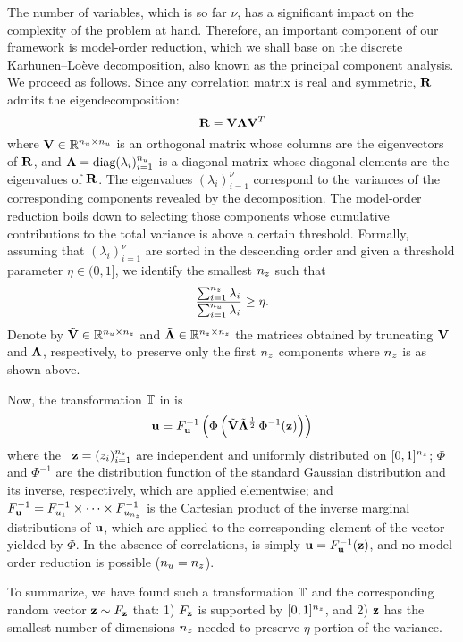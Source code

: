 The number of variables, which is so far $\nu$, has a significant impact on the
complexity of the problem at hand. Therefore, an important component of our
framework is model-order reduction, which we shall base on the discrete
Karhunen--Lo\`{e}ve decomposition, also known as the principal component
analysis. We proceed as follows. Since any correlation matrix is real and
symmetric, $\mathbf{R}$ admits the eigendecomposition:
\[
  \mathbf{R} = \mathbf{V} \mathbf{\Lambda} \mathbf{V}^T
\]
where $\mathbf{V} \in \mathbb{R}^{{n_u} \times {n_u}}$ is an orthogonal matrix whose columns
are the eigenvectors of $\mathbf{R}$, and $\mathbf{\Lambda} = \text{diag}(\lambda_i)_{i =
1}^{n_u}$ is a diagonal matrix whose diagonal elements are the eigenvalues of
$\mathbf{R}$. The eigenvalues $(\lambda_i)_{i = 1}^\nu$ correspond to the
variances of the corresponding components revealed by the decomposition. The
model-order reduction boils down to selecting those components whose cumulative
contributions to the total variance is above a certain threshold. Formally,
assuming that $(\lambda_i)_{i = 1}^\nu$ are sorted in the descending order and
given a threshold parameter $\eta \in (0, 1]$, we identify the smallest ${n_z}$
such that
\[
  \frac{\sum_{i = 1}^{n_z} \lambda_i}{\sum_{i = 1}^{n_u} \lambda_i} \geq \eta.
\]
Denote by $\tilde{\mathbf{V}} \in \mathbb{R}^{{n_u} \times {n_z}}$ and $\tilde{\mathbf{\Lambda}}
\in\mathbb{R}^{{n_z} \times {n_z}}$ the matrices obtained by truncating $\mathbf{V}$ and
$\mathbf{\Lambda}$, respectively, to preserve only the first ${n_z}$ components where
${n_z}$ is as shown above.

Now, the transformation $\mathbb{T}$ in  is
\begin{equation} \elab{transformation-concrete}
  \vu = \distribution_\vu^{-1} \left( \Phi\left( \tilde{\m{V}} \tilde{\m{\Lambda}}^\frac{1}{2} \, \Phi^{-1}(\vz) \right) \right)
\end{equation}
where the \rvs\ $\mathbf{z} = (z_i)_{i = 1}^{n_z}$ are independent and uniformly
distributed on $[0, 1]^{n_z}$; $\Phi$ and $\Phi^{-1}$ are the distribution
function of the standard Gaussian distribution and its inverse, respectively,
which are applied elementwise; and $F_{\mathbf{u}}^{-1} =
F_{u_1}^{-1} \times \cdots \times F_{u_{n_z}}^{-1}$ is
the Cartesian product of the inverse marginal distributions of $\mathbf{u}$, which are
applied to the corresponding element of the vector yielded by $\Phi$. In the
absence of correlations,  is simply $\mathbf{u} =
F_{\mathbf{u}}^{-1}(\mathbf{z})$, and no model-order reduction is possible (${n_u} =
{n_z}$).

To summarize, we have found such a transformation $\mathbb{T}$ and the
corresponding random vector $\mathbf{z} \sim F_{\mathbf{z}}$ that: 1)
$F_{\mathbf{z}}$ is supported by $[0, 1]^{n_z}$, and 2) $\mathbf{z}$ has the smallest
number of dimensions ${n_z}$ needed to preserve $\eta$ portion of the variance.
